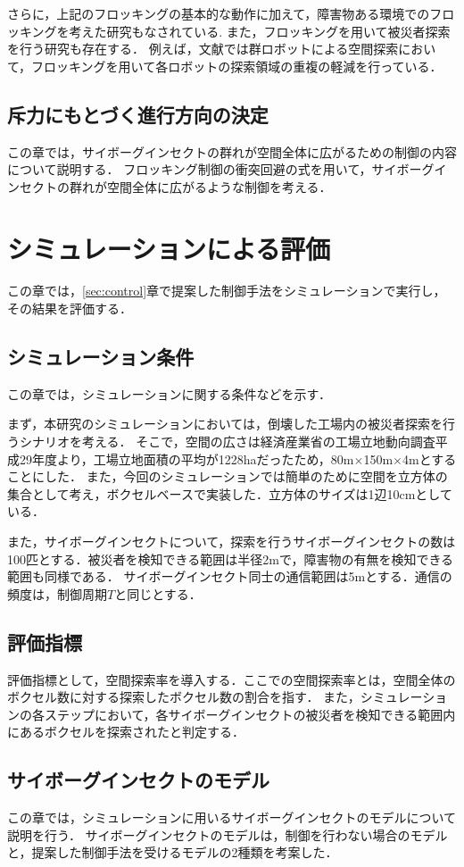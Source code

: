 \documentclass[a4paper,11pt]{jarticle}
\begin{document}
	さらに，上記のフロッキングの基本的な動作に加えて，障害物ある環境でのフロッキングを考えた研究もなされている\cite{obstacle}.
	また，フロッキングを用いて被災者探索を行う研究も存在する．
	例えば，文献\cite{exploration}では群ロボットによる空間探索において，フロッキングを用いて各ロボットの探索領域の重複の軽減を行っている．
	\subsection{斥力にもとづく進行方向の決定}
	この章では，サイボーグインセクトの群れが空間全体に広がるための制御の内容について説明する．
	フロッキング制御の衝突回避の式を用いて，サイボーグインセクトの群れが空間全体に広がるような制御を考える．
	\section{シミュレーションによる評価}
	この章では，\ref{sec:control}章で提案した制御手法をシミュレーションで実行し，その結果を評価する．
	\subsection{シミュレーション条件}
	この章では，シミュレーションに関する条件などを示す．
	
	まず，本研究のシミュレーションにおいては，倒壊した工場内の被災者探索を行うシナリオを考える．
	そこで，空間の広さは経済産業省の工場立地動向調査平成29年度より，工場立地面積の平均が1228haだったため，80m$\times$150m$\times$4mとすることにした．
	また，今回のシミュレーションでは簡単のために空間を立方体の集合として考え，ボクセルベースで実装した．立方体のサイズは1辺10cmとしている．%
	
	また，サイボーグインセクトについて，探索を行うサイボーグインセクトの数は100匹とする．被災者を検知できる範囲は半径2mで，障害物の有無を検知できる範囲も同様である．
	サイボーグインセクト同士の通信範囲は5mとする．通信の頻度は，制御周期$T$と同じとする．
	\subsection{評価指標}
	評価指標として，空間探索率を導入する．ここでの空間探索率とは，空間全体のボクセル数に対する探索したボクセル数の割合を指す．
	また，シミュレーションの各ステップにおいて，各サイボーグインセクトの被災者を検知できる範囲内にあるボクセルを探索されたと判定する．
	\subsection{サイボーグインセクトのモデル}
	\label{sec:algorithm}
	この章では，シミュレーションに用いるサイボーグインセクトのモデルについて説明を行う．
	サイボーグインセクトのモデルは，制御を行わない場合のモデルと，提案した制御手法を受けるモデルの2種類を考案した．
\end{document}
